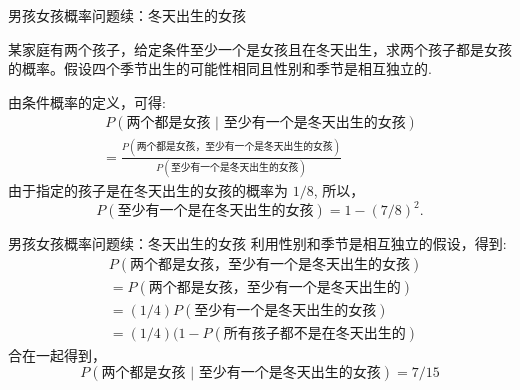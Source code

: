 %
\begin{frame}{男孩女孩概率问题续：冬天出生的女孩}
\begin{exam}
	某家庭有两个孩子，给定条件至少一个是女孩且在冬天出生，求两个孩子都是女孩的概率。假设四个季节出生的可能性相同且性别和季节是相互独立的.
\end{exam}
\pause

    \begin{jieda}
        由条件概率的定义，可得:
        \begin{align*}
            \ P (\mbox{两个都是女孩 | 至少有一个是冬天出生的女孩})\\
            =\frac{P (\mbox{两个都是女孩，至少有一个是冬天出生的女孩})}{P (\mbox{至少有一个是冬天出生的女孩})}
        \end{align*}\pause
		由于指定的孩子是在冬天出生的女孩的概率为 $1/8$, 所以，$$P (\mbox{至少有一个是在冬天出生的女孩}) = 1 - (7/8)^2.$$
    \end{jieda}
\end{frame}


		\begin{frame}{男孩女孩概率问题续：冬天出生的女孩}
			利用性别和季节是相互独立的假设，得到:
        \begin{align*}
            &P (\mbox{两个都是女孩，至少有一个是冬天出生的女孩})\\
            &=P (\mbox{两个都是女孩，至少有一个是冬天出生的})\\
            &=(1/4) P (\mbox{至少有一个是冬天出生的女孩})\\
            &=(1/4) (1-P (\mbox{所有孩子都不是在冬天出生的})
        \end{align*}
        合在一起得到，$$P (\mbox{两个都是女孩 | 至少有一个是冬天出生的女孩})=7/15$$
\end{frame}


